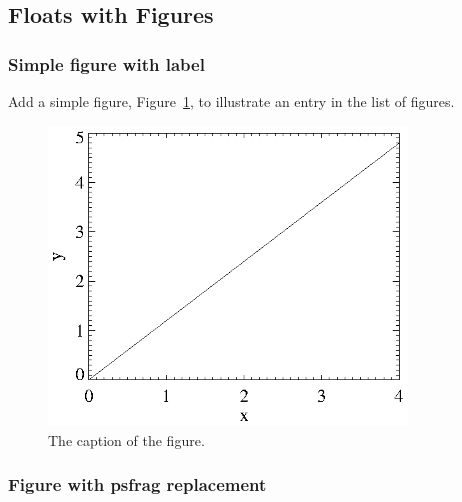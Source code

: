 \subsection{Floats with Figures}

\lipsum[12-13]

\subsubsection{Simple figure with label}

\lipsum[11]

Add a simple figure, Figure~\ref{fig:fig00}, to illustrate
an entry in the list of figures. %
\begin{figure}[tb]
  \begin{center}
   \includegraphics[width=3.75in]{simple.eps}
  \end{center}
  \caption{The caption of the figure.}
\label{fig:fig00}
\end{figure}%
\lipsum[12]

\subsubsection{Figure with psfrag replacement}


